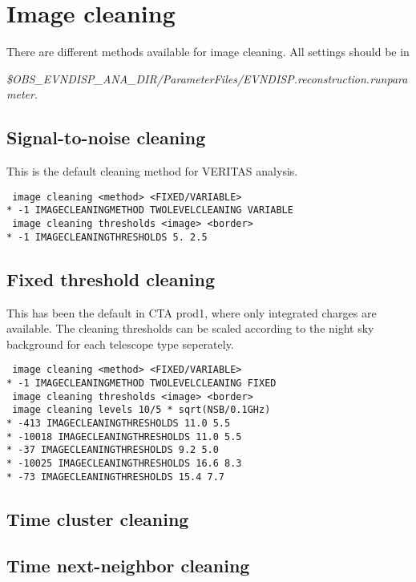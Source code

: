 \documentclass[titlepage,a4paper,twoside,11pt]{report}
\begin{document}
\section{Image cleaning}

There are different methods available for image cleaning.  All settings should be in

{\it \$OBS\_EVNDISP\_ANA\_DIR/ParameterFiles/EVNDISP.reconstruction.runparameter}.

\subsection{Signal-to-noise cleaning}

This is the default cleaning method for VERITAS analysis.

\begin{lstlisting}
 image cleaning <method> <FIXED/VARIABLE>
* -1 IMAGECLEANINGMETHOD TWOLEVELCLEANING VARIABLE
 image cleaning thresholds <image> <border>
* -1 IMAGECLEANINGTHRESHOLDS 5. 2.5
\end{lstlisting}

\subsection{Fixed threshold cleaning}

This has been the default in CTA prod1, where only integrated charges are available. The cleaning thresholds can be scaled according to the night sky background for each telescope type seperately. 

\begin{lstlisting}
 image cleaning <method> <FIXED/VARIABLE>
* -1 IMAGECLEANINGMETHOD TWOLEVELCLEANING FIXED
 image cleaning thresholds <image> <border>
 image cleaning levels 10/5 * sqrt(NSB/0.1GHz)
* -413 IMAGECLEANINGTHRESHOLDS 11.0 5.5
* -10018 IMAGECLEANINGTHRESHOLDS 11.0 5.5
* -37 IMAGECLEANINGTHRESHOLDS 9.2 5.0
* -10025 IMAGECLEANINGTHRESHOLDS 16.6 8.3
* -73 IMAGECLEANINGTHRESHOLDS 15.4 7.7
\end{lstlisting}

\subsection{Time cluster cleaning}

\subsection{Time next-neighbor cleaning}
\end{document}

